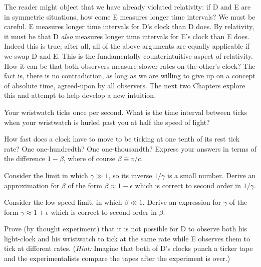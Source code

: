 The reader might object that we have already violated relativity: if D
and E are in symmetric situations, how come E measures longer time
intervals?  We must be careful.  E measures longer time intervals for
D's clock than D does.  By relativity, it must be that D {\em also\/}
measures longer time intervals for E's clock than E does.  Indeed this
is true; after all, all of the above arguments are equally applicable
if we swap D and E.  This is the fundamentally counterintuitive aspect
of relativity.  How it can be that both observers measure slower rates
on the other's clock?  The fact is, there is no contradiction, as long
as we are willing to give up on a concept of absolute time,
agreed-upon by all observers.  The next two Chapters explore this and
attempt to help develop a new intuition.

\begin{problem}
Your wristwatch ticks once per second.  What is the time interval
between ticks when your wristwatch is hurled past you at half the
speed of light?
\end{problem}

\begin{problem}
How fast does a clock have to move to be ticking at one tenth of its
rest tick rate?  One one-hundredth?  One one-thousandth?  Express your
answers in terms of the difference $1-\beta$, where of course
$\beta\equiv v/c$.
\end{problem}

\begin{problem}
Consider the limit in which $\gamma\gg 1$, so its inverse $1/\gamma$
is a small number.  Derive an approximation for $\beta$ of the form
$\beta\approx 1-\epsilon$ which is correct to second order in
$1/\gamma$.
\end{problem}

\begin{problem}
Consider the low-speed limit, in which $\beta\ll 1$.  Derive an
expression for $\gamma$ of the form $\gamma\approx 1+\epsilon$ which
is correct to second order in $\beta$.
\end{problem}

\begin{problem}
Prove (by thought experiment) that it is not possible for D to observe
both his light-clock and his wristwatch to tick at the same rate while
E observes them to tick at different rates.  ({\em Hint:\/} Imagine
that both of D's clocks punch a ticker tape and the experimentalists
compare the tapes after the experiment is over.)
\end{problem}


